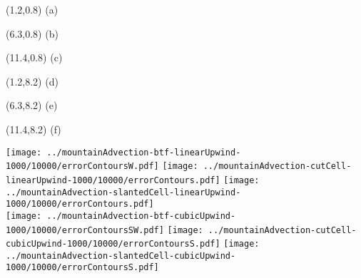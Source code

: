 \documentclass{article}
\begin{document}
\TPMargin{2pt}
\begin{textblock}{0.55}(1.2,0.8)
\normalsize
(a)
\end{textblock}
\begin{textblock}{0.55}(6.3,0.8)
\normalsize
(b)
\end{textblock}
\begin{textblock}{0.55}(11.4,0.8)
\normalsize
(c)
\end{textblock}
\begin{textblock}{0.55}(1.2,8.2)
\normalsize
(d)
\end{textblock}
\begin{textblock}{0.55}(6.3,8.2)
\normalsize
(e)
\end{textblock}
\begin{textblock}{0.55}(11.4,8.2)
\normalsize
(f)
\end{textblock}
\texttt{[image: ../mountainAdvection-btf-linearUpwind-1000/10000/errorContoursW.pdf]}
\hspace*{0.26em}
\texttt{[image: ../mountainAdvection-cutCell-linearUpwind-1000/10000/errorContours.pdf]}
\hspace*{0.26em}
\texttt{[image: ../mountainAdvection-slantedCell-linearUpwind-1000/10000/errorContours.pdf]} \\
\texttt{[image: ../mountainAdvection-btf-cubicUpwind-1000/10000/errorContoursSW.pdf]}
\texttt{[image: ../mountainAdvection-cutCell-cubicUpwind-1000/10000/errorContoursS.pdf]}
\texttt{[image: ../mountainAdvection-slantedCell-cubicUpwind-1000/10000/errorContoursS.pdf]}
\end{document}
